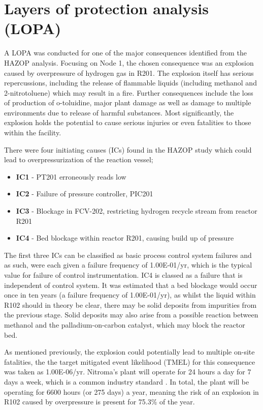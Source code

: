 \section{Layers of protection analysis (LOPA)}

A LOPA was conducted for one of the major consequences identified from the HAZOP analysis. Focusing on Node 1, the chosen consequence was an explosion caused by overpressure of hydrogen gas in R201. The explosion itself has serious repercussions, including the release of flammable liquids (including methanol and 2-nitrotoluene) which may result in a fire. Further consequences include the loss of production of o-toluidine, major plant damage as well as damage to multiple environments due to release of harmful substances. Most significantly, the explosion holds the potential to cause serious injuries or even fatalities to those within the facility. 

There were four initiating causes (ICs) found in the HAZOP study which could lead to overpressurization of the reaction vessel;

\begin{itemize}
\item \textbf{IC1} - PT201 erroneously reads low 
\item \textbf{IC2} - Failure of pressure controller, PIC201 
\item \textbf{IC3 }- Blockage in FCV-202, restricting hydrogen recycle stream from reactor R201 
\item \textbf{IC4} - Bed blockage within reactor R201, causing build up of pressure 
\end{itemize}

The first three ICs can be classified as basic process control system failures and as such, were each given a failure frequency of 1.00E-01/yr, which is the typical value for failure of control instrumentation. IC4 is classed as a failure that is independent of control system. It was estimated that a bed blockage would occur once in ten years (a failure frequency of 1.00E-01/yr), as whilst the liquid within R102 should in theory be clear, there may be solid deposits from impurities from the previous stage. Solid deposits may also arise from a possible reaction between methanol and the palladium-on-carbon catalyst, which may block the reactor bed. 


As mentioned previously, the explosion could potentially lead to multiple on-site fatalities, the the target mitigated event likelihood (TMEL) for this consequence was taken as 1.00E-06/yr. Nitroma's plant will operate for 24 hours a day for 7 days a week, which is a common industry standard \cite{job_guide_chemical_2021}. In total, the plant will be operating for 6600 hours (or 275 days) a year, meaning the risk of an explosion in R102 caused by overpressure is present for 75.3\% of the year.  
 
